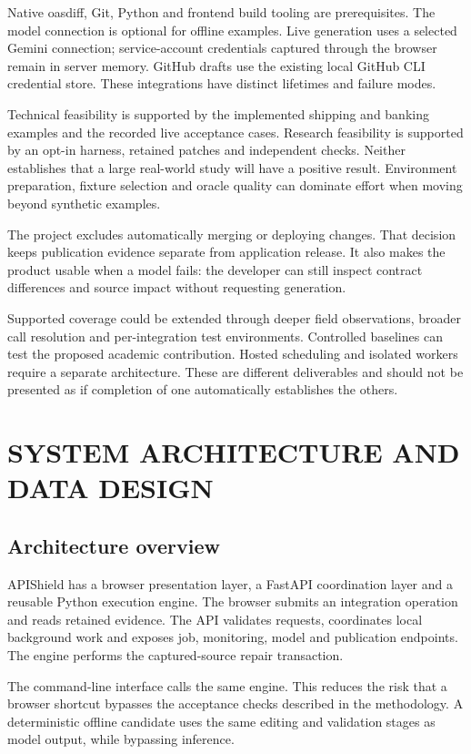 \documentclass[12pt,a4paper,oneside]{report}
\begin{document}
Native oasdiff, Git, Python and frontend build tooling are prerequisites. The model connection is optional for offline examples. Live generation uses a selected Gemini connection; service-account credentials captured through the browser remain in server memory. GitHub drafts use the existing local GitHub CLI credential store. These integrations have distinct lifetimes and failure modes.

Technical feasibility is supported by the implemented shipping and banking examples and the recorded live acceptance cases. Research feasibility is supported by an opt-in harness, retained patches and independent checks. Neither establishes that a large real-world study will have a positive result. Environment preparation, fixture selection and oracle quality can dominate effort when moving beyond synthetic examples.

The project excludes automatically merging or deploying changes. That decision keeps publication evidence separate from application release. It also makes the product usable when a model fails: the developer can still inspect contract differences and source impact without requesting generation.

Supported coverage could be extended through deeper field observations, broader call resolution and per-integration test environments. Controlled baselines can test the proposed academic contribution. Hosted scheduling and isolated workers require a separate architecture. These are different deliverables and should not be presented as if completion of one automatically establishes the others.

\chapter{SYSTEM ARCHITECTURE AND DATA DESIGN}
\section{Architecture overview}

APIShield has a browser presentation layer, a FastAPI coordination layer and a reusable Python execution engine. The browser submits an integration operation and reads retained evidence. The API validates requests, coordinates local background work and exposes job, monitoring, model and publication endpoints. The engine performs the captured-source repair transaction.

The command-line interface calls the same engine. This reduces the risk that a browser shortcut bypasses the acceptance checks described in the methodology. A deterministic offline candidate uses the same editing and validation stages as model output, while bypassing inference.
\end{document}
